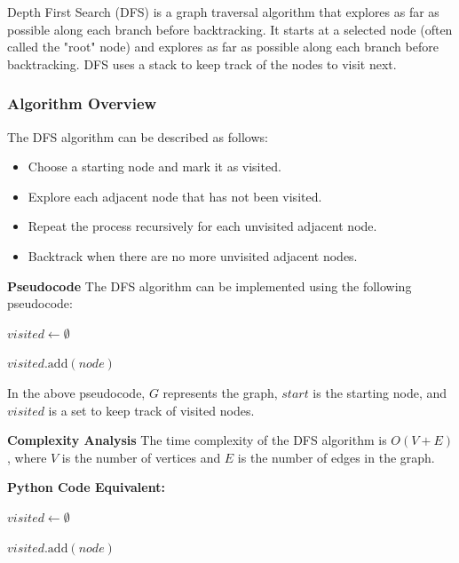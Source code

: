 \documentclass[12pt]{book} %
\begin{document}
Depth First Search (DFS) is a graph traversal algorithm that explores as far as possible along each branch before backtracking. It starts at a selected node (often called the "root" node) and explores as far as possible along each branch before backtracking. DFS uses a stack to keep track of the nodes to visit next.

\subsubsection{Algorithm Overview}

The DFS algorithm can be described as follows:
\FloatBarrier
\begin{itemize}
    \item Choose a starting node and mark it as visited.
    \item Explore each adjacent node that has not been visited.
    \item Repeat the process recursively for each unvisited adjacent node.
    \item Backtrack when there are no more unvisited adjacent nodes.
\end{itemize}
\FloatBarrier
\textbf{Pseudocode}
\FloatBarrier
The DFS algorithm can be implemented using the following pseudocode:
\FloatBarrier
\begin{algorithm}
\caption{Depth First Search (DFS)}
\begin{algorithmic}[1]
    \State $visited \gets \emptyset$
    \State {}
\EndFunction

    \State $visited.\text{add}(node)$
            \State {}
        \EndIf
    \EndFor
\EndFunction
\end{algorithmic}
\end{algorithm}
\FloatBarrier
In the above pseudocode, $G$ represents the graph, $start$ is the starting node, and $visited$ is a set to keep track of visited nodes.
\FloatBarrier

\textbf{Complexity Analysis}
\FloatBarrier
The time complexity of the DFS algorithm is $O(V + E)$, where $V$ is the number of vertices and $E$ is the number of edges in the graph.

\FloatBarrier
\textbf{Python Code Equivalent:}
\FloatBarrier
\begin{algorithm}
\caption{Depth First Search (DFS)}
\begin{algorithmic}[1]
    \State $visited \gets \emptyset$
    \State {}
\EndFunction

    \State $visited.\text{add}(node)$
            \State {}
        \EndIf
    \EndFor
\EndFunction
\end{algorithmic}
\end{algorithm}
\FloatBarrier
\end{document}
